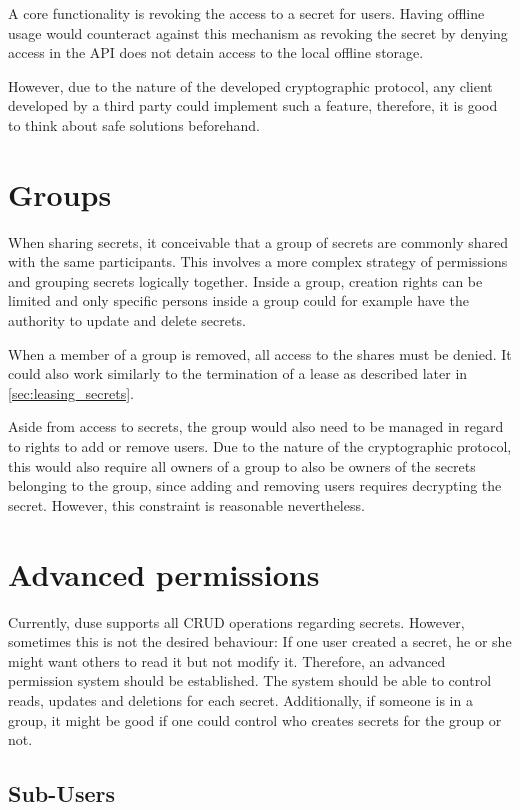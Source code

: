 A core functionality is revoking the access to a secret for users. Having
offline usage would counteract against this mechanism as revoking the secret by
denying access in the API does not detain access to the local offline storage.

However, due to the nature of the developed cryptographic protocol, any client
developed by a third party could implement such a feature, therefore, it is
good to think about safe solutions beforehand.

\section{Groups}

When sharing secrets, it conceivable that a group of secrets are commonly
shared with the same participants. This involves a more complex strategy of
permissions and grouping secrets logically together. Inside a group, creation
rights can be limited and only specific persons inside a group could for
example have the authority to update and delete secrets.

When a member of a group is removed, all access to the shares must be denied.
It could also work similarly to the termination of a lease as described later in
\ref{sec:leasing_secrets}.

Aside from access to secrets, the group would also need to be managed in regard
to rights to add or remove users. Due to the nature of the cryptographic
protocol, this would also require all owners of a group to also be owners of
the secrets belonging to the group, since adding and removing users requires
decrypting the secret. However, this constraint is reasonable nevertheless.

\section{Advanced permissions}

Currently, duse supports all CRUD operations regarding secrets. However,
sometimes this is not the desired behaviour: If one user created a secret, he
or she might want others to read it but not modify it. Therefore, an advanced
permission system should be established. The system should be able to control
reads, updates and deletions for each secret. Additionally, if someone is in a
group, it might be good if one could control who creates secrets for the group
or not.

\subsection{Sub-Users}


